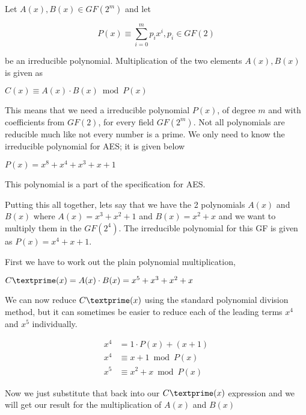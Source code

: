 Let $A(x), B(x) \in GF(2^m)$ and let 

\begin{center}
$$ P(x) \equiv \sum_{i=0}^{m} p_ix^i, p_i \in GF(2) $$
\end{center}

be an irreducible polynomial. Multiplication of the two elements $A(x), B(x)$ is given as

\begin{center}
$C(x) \equiv A(x) \cdot B(x) \bmod P(x)$
\end{center}

This means that we need a irreducible polynomial $P(x)$, of degree $m$ and with coefficients from $GF(2)$, for every field $GF(2^m)$. Not all polynomials are reducible much like not every number is a prime. We only need to know the irreducible polynomial for AES; it is given below

\begin{center}
$P(x) = x^8 + x^4 + x^3 + x + 1$
\end{center}

This polynomial is a part of the specification for AES. 

Putting this all together, lets say that we have the 2 polynomials $A(x)$ and $B(x)$ where $A(x) = x^3 + x^2 + 1$ and $B(x) = x^2 + x$ and we want to multiply them in the $GF(2^4)$. The irreducible polynomial for this GF is given as $P(x) = x^4 + x + 1$.

First we have to work out the plain polynomial multiplication,

\begin{center}
$C\textprime(x) = A(x) \cdot B(x) = x^5 + x^3 + x^2 + x $
\end{center}

We can now reduce $C\textprime(x)$ using the standard polynomial division method, but it can sometimes be easier to reduce each of the leading terms $x^4$ and $x^5$ individually.

\begin{center}
\begin{align*}
x^4 &= 1 \cdot P(x) + (x+1)\\
x^4 &\equiv x + 1 \bmod P(x) \\
x^5 &\equiv x^2 + x \bmod P(x)
\end{align*}
\end{center} 

Now we just substitute that back into our $C\textprime(x)$ expression and we will get our result for the multiplication of $A(x)$ and $B(x)$

